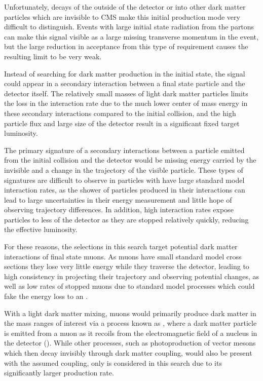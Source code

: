 Unfortunately, decays of the \aprime outside of the detector or into other dark matter particles which are invisible to CMS make this initial production mode very difficult to distinguish.
Events with large initial state radiation from the partons can make this signal visible as a large missing transverse momentum in the event, but the large reduction in acceptance from this type of requirement causes the resulting limit to be very weak.

Instead of searching for dark matter production in the initial state, the signal could appear in a secondary interaction between a final state particle and the detector itself.
The relatively small masses of light dark matter particles limits the loss in the interaction rate due to the much lower center of mass energy in these secondary interactions compared to the initial collision, and the high particle flux and large size of the detector result in a significant fixed target luminosity.

The primary signature of a secondary interactions between a particle emitted from the initial collision and the detector would be missing energy carried by the invisible \aprime and a change in the trajectory of the visible particle.
These types of signatures are difficult to observe in particles with have large standard model interaction rates, as the shower of particles produced in their interactions can lead to large uncertainties in their energy measurement and little hope of observing trajectory differences.
In addition, high interaction rates expose particles to less of the detector as they are stopped relatively quickly, reducing the effective luminosity.

For these reasons, the selections in this search target potential dark matter interactions of final state muons.
As muons have small standard model cross sections they lose very little energy while they traverse the detector, leading to high consistency in projecting their trajectory and observing potential changes, as well as low rates of stopped muons due to standard model processes which could fake the energy loss to an \aprime.

With a light dark matter mixing, muons would primarily produce dark matter in the mass ranges of interest via a process known as \dbrem, where a dark matter particle is emitted from a muon as it recoils from the electromagnetic field of a nucleus in the detector ().
While other processes, such as photoproduction of vector mesons which then decay invisibly through dark matter coupling, would also be present with the assumed coupling, only \dbrem is considered in this search due to its significantly larger production rate.

